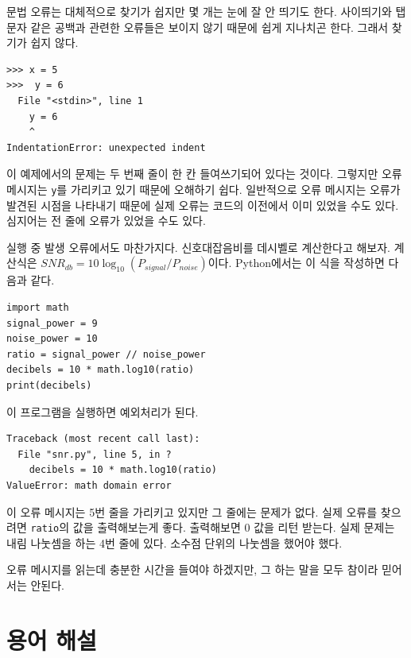 \documentclass[10pt]{book}
\begin{document}
문법 오류는 대체적으로 찾기가 쉽지만 몇 개는 눈에 잘 안 띄기도 한다.
사이띄기와 탭 문자 같은 공백과 관련한 오류들은 보이지 않기 때문에 쉽게
지나치곤 한다.  그래서 찾기가 쉽지 않다.

\begin{verbatim}
>>> x = 5
>>>  y = 6
  File "<stdin>", line 1
    y = 6
    ^
IndentationError: unexpected indent
\end{verbatim}
%
이 예제에서의 문제는 두 번째 줄이 한 칸 들여쓰기되어 있다는 것이다.
그렇지만 오류 메시지는 {\tt y}를 가리키고 있기 때문에 오해하기 쉽다.
일반적으로 오류 메시지는 오류가 발견된 시점을 나타내기 때문에 실제
오류는 코드의 이전에서 이미 있었을 수도 있다.  심지어는 전 줄에 오류가
있었을 수도 있다.

실행 중 발생 오류에서도 마찬가지다.  신호대잡음비를 데시벨로 계산한다고
해보자.  계산식은 $SNR_{db} = 10 \log_{10} (P_{signal} /
P_{noise})$이다.  Python에서는 이 식을 작성하면 다음과 같다.

\begin{verbatim}
import math
signal_power = 9
noise_power = 10
ratio = signal_power // noise_power
decibels = 10 * math.log10(ratio)
print(decibels)
\end{verbatim}
%
이 프로그램을 실행하면 예외처리가 된다. 
%

\begin{verbatim}
Traceback (most recent call last):
  File "snr.py", line 5, in ?
    decibels = 10 * math.log10(ratio)
ValueError: math domain error
\end{verbatim}
%
이 오류 메시지는 5번 줄을 가리키고 있지만 그 줄에는 문제가 없다.  실제
오류를 찾으려면 {\tt ratio}의 값을 출력해보는게 좋다.  출력해보면 0
값을 리턴 받는다.  실제 문제는 내림 나눗셈을 하는 4번 줄에 있다.
소수점 단위의 나눗셈을 했어야 했다.

오류 메시지를 읽는데 충분한 시간을 들여야 하겠지만, 그 하는 말을 모두
참이라 믿어서는 안된다.


\section{용어 해설}
\end{document}

